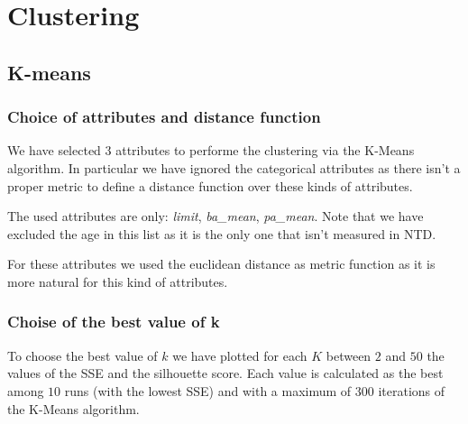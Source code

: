  \chapter{Clustering}

\section{K-means}
\subsection{Choice of attributes and distance function}

We have selected $3$ attributes to performe the clustering via the K-Means algorithm.
In particular we have ignored the categorical attributes as there isn't a proper metric to define a distance function over these kinds of attributes.

The used attributes are only: \textit{limit}, \textit{ba\_mean}, \textit{pa\_mean}. Note that we have excluded the age in this list as it is the only one that isn't measured in NTD.

For these attributes we used the euclidean distance as metric function as it is more natural for this kind of attributes.

\subsection{Choise of the best value of k}

To choose the best value of $k$ we have plotted for each $K$ between $2$ and $50$ the values of the SSE and the silhouette score. Each value is calculated as the best among $10$ runs (with the lowest SSE) and with a maximum of $300$ iterations of the K-Means algorithm.

